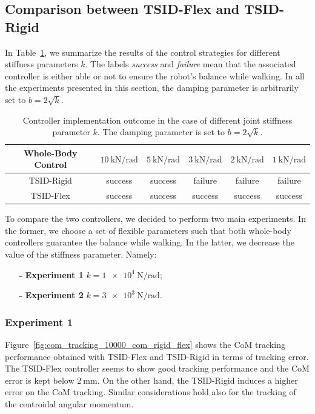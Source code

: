 \subsection{Comparison between TSID-Flex and TSID-Rigid}
In Table~\ref{tab:flex_joint_architecture_outcome}, we summarize the results of the control strategies for different stiffness parameters $k$. The labels \emph{success} and \emph{failure} mean that the associated controller is either able or not to ensure the robot's balance while walking. In all the experiments presented in this section, the damping parameter is arbitrarily set to $b=2\sqrt{k}$. 
\par
\begin{table}[b]
    \centering
    \caption[Controllers outcome in the case of different joint stiffness parameter $k$]{Controller implementation outcome in the case of different joint stiffness parameter $k$. The damping parameter is set to $b=2\sqrt{k}$. 
    }
    \begin{tabular}{c|ccccc}
         Whole-Body Control &
         $\SI{10}{\kilo\newton\per\radian}$ & $\SI{5}{\kilo \newton\per\radian}$&$\SI{3}{\kilo \newton\per\radian}$& $\SI{2}{\kilo \newton\per\radian}$& $\SI{1}{\kilo \newton\per\radian}$  \\
        \hline
        TSID-Rigid  & success  &  success & failure& failure& failure\\
        TSID-Flex  & success  & success & success  & success & success  
    \end{tabular}
    \label{tab:flex_joint_architecture_outcome}
\end{table}
To compare the two controllers, we decided to perform two main experiments. In the former, we choose a set of flexible parameters such that both whole-body controllers guarantee the balance while walking. In the latter, we decrease the value of the stiffness parameter. Namely: 
\begin{itemize}
    \item[\textbf{-}]\textbf{Experiment 1} $k=\SI{1e4}{\newton \per \radian}$;
    \item[\textbf{-}]\textbf{Experiment 2} $k=\SI{3e3}{\newton \per \radian}$.
\end{itemize}

\subsubsection{Experiment 1}
Figure~\ref{fig:com_tracking_10000_com_rigid_flex} shows the CoM tracking performance obtained with TSID-Flex and TSID-Rigid in terms of tracking error. The TSID-Flex controller seems to show good tracking performance and the CoM error is kept below $\SI{2}{\milli \meter}$. On the other hand, the TSID-Rigid induces a higher error on the CoM tracking.
Similar considerations hold also for the tracking of the centroidal angular momentum.

